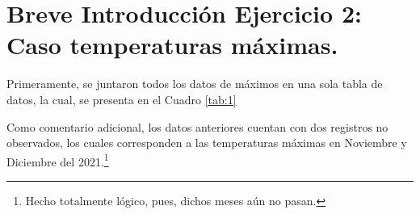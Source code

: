 \documentclass[10.5pt,notitlepage]{article}
\theoremstyle{plain}
\begin{document}
\section{Breve Introducción Ejercicio 2: Caso temperaturas máximas.}
Primeramente, se juntaron todos los datos de máximos en una sola tabla de datos, la cual, se presenta en el Cuadro \ref{tab:1} 
\begin{table}[H]
        \centering
        \caption{Datos de temperaturas máximas en Albania por mes, durante los años \(1900\) a \(2021\).}
        \label{tab:1}
\end{table}
Como comentario adicional, los datos anteriores cuentan con dos registros no observados, los cuales corresponden a las temperaturas máximas en Noviembre y Diciembre del 2021.\footnote{Hecho totalmente lógico, pues, dichos meses aún no pasan.} 
\end{document}
